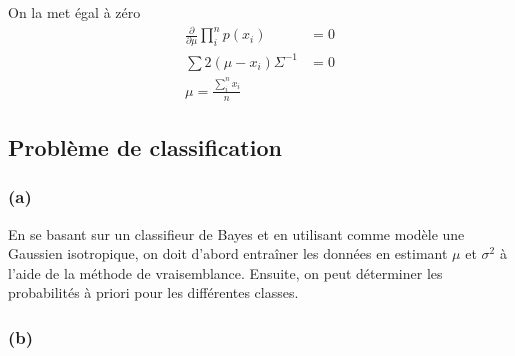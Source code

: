 \documentclass{article}
\begin{document}
	On la met égal à zéro
		\begin{equation}
		\begin{split}
		\frac{\partial}{\partial \mu}\prod_{i}^{n} p(x_{i}) &= 0 \\
		\sum 2(\mu - x_{i}) \Sigma^{-1} &= 0 \\
		\mu = \frac{\sum_{i}^{n} x_{i}}{n}
		\end{split}
		\end{equation}		
	
	\subsection{Problème de classification}
		
	\subsubsection*{(a)}
	En se basant sur un classifieur de Bayes et en utilisant comme modèle une Gaussien isotropique, on doit d'abord entraîner les données en estimant $\mu$ et $\sigma^2$ à l'aide de la méthode de vraisemblance.
	Ensuite, on peut déterminer les probabilités à priori pour les différentes classes.
		
	\subsubsection*{(b)}
	
\end{document}
